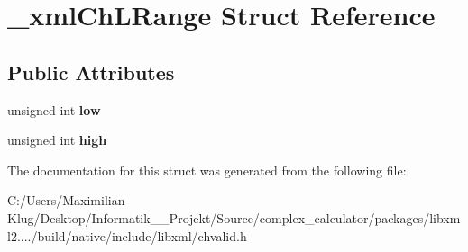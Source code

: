 \hypertarget{struct__xml_ch_l_range}{}\section{\+\_\+xml\+Ch\+L\+Range Struct Reference}
\label{struct__xml_ch_l_range}
\subsection*{Public Attributes}
\begin{DoxyCompactItemize}
\item 
\mbox{\label{struct__xml_ch_l_range_a800f5f23caaf4e69f2db471e198128b8}} 
unsigned int {\bfseries low}
\item 
\mbox{\label{struct__xml_ch_l_range_aae73630963e58384bec6d57ede374132}} 
unsigned int {\bfseries high}
\end{DoxyCompactItemize}


The documentation for this struct was generated from the following file\+:\begin{DoxyCompactItemize}
\item 
C\+:/\+Users/\+Maximilian Klug/\+Desktop/\+Informatik\+\_\+\_\+\+Projekt/\+Source/complex\+\_\+calculator/packages/libxml2..../build/native/include/libxml/chvalid.\+h\end{DoxyCompactItemize}
